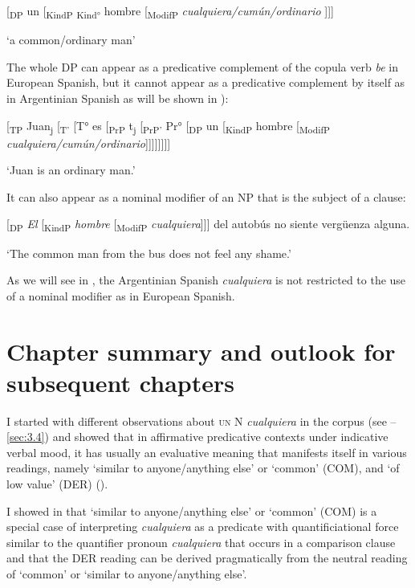 {\ea \label{ex:key:183} %
  [\textsubscript{DP} un [\textsubscript{KindP} \textsubscript{Kind°} hombre [\textsubscript{ModifP} \textit{cualquiera/cumún/ordinario} ]]]

\glt ‘a common/ordinary man’
\z

The whole DP can appear as a predicative complement of the copula verb \textit{be} in European Spanish, but it cannot appear as a predicative complement by itself as in Argentinian Spanish as will be shown in ): 

\ea{} \label{ex:key:184} %
  [\textsubscript{TP} Juan\textsubscript{j} [\textsubscript{T'} [T° es [\textsubscript{PrP} t\textsubscript{j} [\textsubscript{PrP'} Pr°\textsubscript{} [\textsubscript{DP} un [\textsubscript{KindP} hombre [\textsubscript{ModifP} \textit{cualquiera/cumún/ordinario}]]]]]]]]

\glt ‘Juan is an ordinary man.’
\z

It can also appear as a nominal modifier of an NP that is the subject of a clause:

\ea{} \label{ex:key:185} %
  [\textsubscript{DP} \textit{El} [\textsubscript{KindP} \textit{hombre} [\textsubscript{ModifP} \textit{cualquiera}]]] del autobús no siente vergüenza alguna.

\glt ‘The common man from the bus does not feel any shame.’
\z

As we will see in , the Argentinian Spanish \textit{cualquiera} is not restricted to the use of a nominal modifier as in European Spanish.

\section{{Chapter} {summary} {and} {outlook} {for} {subsequent} {chapters}} \label{sec:3.5}
\largerpage
I started with different observations about \textsc{un} N \textit{cualquiera} in the corpus (see –\ref{sec:3.4}) and showed that in affirmative predicative contexts under indicative verbal mood, it has usually an evaluative meaning that manifests itself in various readings, namely ‘similar to anyone/anything else’ or ‘common’ (COM), and ‘of low value’ (DER) ().


I showed in  that ‘similar to anyone/anything else’ or ‘common’ (COM) is a special case of interpreting \textit{cualquiera} as a predicate with quantificiational force similar to the quantifier pronoun \textit{cualquiera} that occurs in a comparison clause and that the DER reading can be derived pragmatically from the neutral reading of ‘common’ or ‘similar to anyone/anything else’.

}
